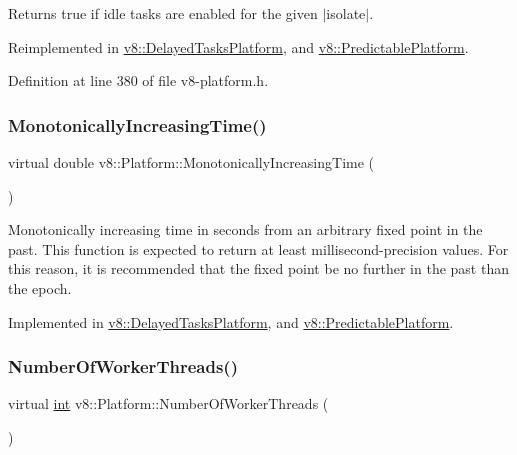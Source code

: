 Returns true if idle tasks are enabled for the given $\vert$isolate$\vert$. 

Reimplemented in \mbox{\hyperlink{classv8_1_1DelayedTasksPlatform_a1ac3788b072ee705cd2de6cc08556295}{v8\+::\+Delayed\+Tasks\+Platform}}, and \mbox{\hyperlink{classv8_1_1PredictablePlatform_ad79dbc4e7ebdbbe1c3cc90872161f845}{v8\+::\+Predictable\+Platform}}.



Definition at line 380 of file v8-\/platform.\+h.

\mbox{\label{classv8_1_1Platform_a6d4d7c2dcf6b0c7113099b97fa7f57b7}} 
\subsubsection{\texorpdfstring{Monotonically\+Increasing\+Time()}{MonotonicallyIncreasingTime()}}
{\footnotesize\ttfamily virtual double v8\+::\+Platform\+::\+Monotonically\+Increasing\+Time (\begin{DoxyParamCaption}{ }\end{DoxyParamCaption})\hspace{0.3cm}{\ttfamily [pure virtual]}}

Monotonically increasing time in seconds from an arbitrary fixed point in the past. This function is expected to return at least millisecond-\/precision values. For this reason, it is recommended that the fixed point be no further in the past than the epoch. 

Implemented in \mbox{\hyperlink{classv8_1_1DelayedTasksPlatform_a071eea7329b3d7ed1f2b9c4a444bf128}{v8\+::\+Delayed\+Tasks\+Platform}}, and \mbox{\hyperlink{classv8_1_1PredictablePlatform_a5ea9a10dff864d311e3612ec340a6710}{v8\+::\+Predictable\+Platform}}.

\mbox{\label{classv8_1_1Platform_a57cdd7eb4c482bfb806c378beeda716d}} 
\subsubsection{\texorpdfstring{Number\+Of\+Worker\+Threads()}{NumberOfWorkerThreads()}}
{\footnotesize\ttfamily virtual \mbox{\hyperlink{classint}{int}} v8\+::\+Platform\+::\+Number\+Of\+Worker\+Threads (\begin{DoxyParamCaption}{ }\end{DoxyParamCaption})\hspace{0.3cm}{\ttfamily [pure virtual]}}

